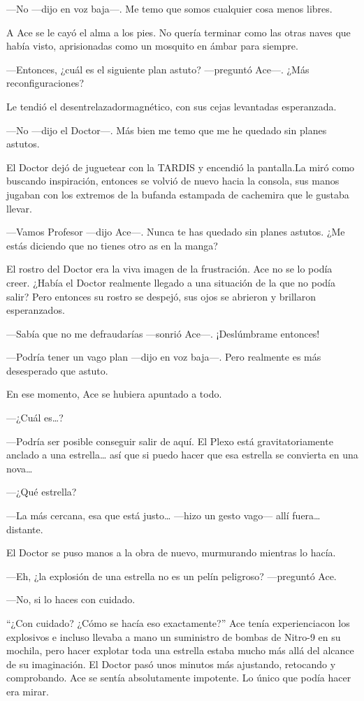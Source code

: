 ---No ---dijo en voz baja---. Me temo que somos cualquier cosa
menos libres.

A Ace se le cayó el alma a los pies. No quería terminar como las
otras naves que había visto, aprisionadas como un mosquito en ámbar para
siempre.

---Entonces, ¿cuál es el siguiente plan astuto? ---preguntó
Ace---. ¿Más reconfiguraciones? 

Le tendió el desentrelazadormagnético, con sus cejas levantadas
esperanzada.

---No ---dijo el Doctor---. Más bien me temo que me he quedado
sin planes astutos.

El Doctor dejó de juguetear con la TARDIS y encendió la
pantalla.La miró como buscando inspiración, entonces se volvió de nuevo
hacia la consola, sus manos jugaban con los extremos de la bufanda
estampada de cachemira que le gustaba llevar.

---Vamos Profesor ---dijo Ace---. Nunca te has quedado sin
planes astutos. ¿Me estás diciendo que no tienes otro as en la manga?

El rostro del Doctor era la viva imagen de la frustración. Ace
no se lo podía creer. ¿Había el Doctor realmente llegado a una situación
de la que no podía salir? Pero entonces su rostro se despejó, sus ojos
se abrieron y brillaron esperanzados.

---Sabía que no me defraudarías ---sonrió Ace---. ¡Deslúmbrame
entonces!

---Podría tener un vago plan ---dijo en voz baja---. Pero
realmente es más desesperado que astuto.

En ese momento, Ace se hubiera apuntado a todo.

---¿Cuál es\ldots{}?

---Podría ser posible conseguir salir de aquí. El Plexo está
gravitatoriamente anclado a una estrella\ldots{} así que si puedo hacer
que esa estrella se convierta en una nova\ldots{}

---¿Qué estrella?

---La más cercana, esa que está justo\ldots{} ---hizo un gesto
vago--- allí fuera\ldots{} distante.

El Doctor se puso manos a la obra de nuevo, murmurando mientras
lo hacía.

---Eh, ¿la explosión de una estrella no es un pelín peligroso?
---preguntó Ace.

---No, si lo haces con cuidado.

``¿Con cuidado? ¿Cómo se hacía eso exactamente?'' Ace tenía
experienciacon los explosivos e incluso llevaba a mano un suministro de
bombas de Nitro-9 en su mochila, pero hacer explotar toda una estrella
estaba mucho más allá del alcance de su imaginación. El Doctor pasó unos
minutos más ajustando, retocando y comprobando. Ace se sentía
absolutamente impotente. Lo único que podía hacer era mirar.

